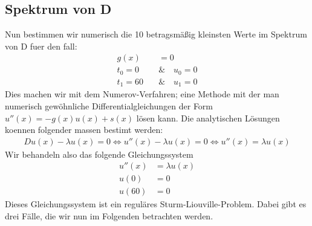 \documentclass[ngerman]{scrartcl}
\begin{document}
\subsection{Spektrum von D}
	Nun bestimmen wir numerisch die 10 betragsmäßig kleinsten Werte im Spektrum von D fuer den fall:
	\begin{align}
		g(x)&=0\\
		t_0=0 \quad&\&\quad u_0=0\nonumber\\
		t_1=60 \quad&\&\quad u_1=0\nonumber
	\end{align}
	Dies machen wir mit dem Numerov-Verfahren; eine Methode mit der man numerisch gewöhnliche Differentialgleichungen der Form $u''(x)=-g(x)u(x)+s(x)$ lösen kann.
	Die analytischen Lösungen koennen folgender massen bestimt werden:
	\begin{align*}
		D u(x) - \lambda u(x) = 0 \Leftrightarrow u''(x) - \lambda u(x) = 0 \Leftrightarrow u''(x) = \lambda u(x)
	\end{align*}
	Wir behandeln also das folgende Gleichungssystem
	\begin{align}
		u''(x) &= \lambda u(x)\\
		u(0) &= 0\nonumber\\
		u(60) &= 0\nonumber
	\end{align}
	Dieses Gleichungssystem ist ein reguläres Sturm-Liouville-Problem. Dabei gibt es drei Fälle, die wir nun im Folgenden betrachten werden.
\end{document}
